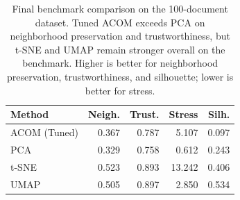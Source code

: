 \begin{table}[!tb]
  \caption{Final benchmark comparison on the 100-document dataset. Tuned ACOM exceeds PCA on neighborhood preservation and trustworthiness, but t-SNE and UMAP remain stronger overall on the benchmark. Higher is better for neighborhood preservation, trustworthiness, and silhouette; lower is better for stress.}
  \label{tab:main-comparison}
  \centering
  \small
  \begin{tabular}{lrrrr}
    \toprule
    Method & Neigh. & Trust. & Stress & Silh. \\
    \midrule
    ACOM (Tuned) & 0.367 & 0.787 & 5.107 & 0.097 \\
    PCA & 0.329 & 0.758 & 0.612 & 0.243 \\
    t-SNE & 0.523 & 0.893 & 13.242 & 0.406 \\
    UMAP & 0.505 & 0.897 & 2.850 & 0.534 \\
    \bottomrule
  \end{tabular}
\end{table}
